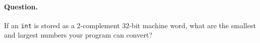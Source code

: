 \paragraph{Question.} If an \texttt{int} is stored as a
  2-complement 32-bit machine word, what are the smallest and largest
  numbers your program can convert?
